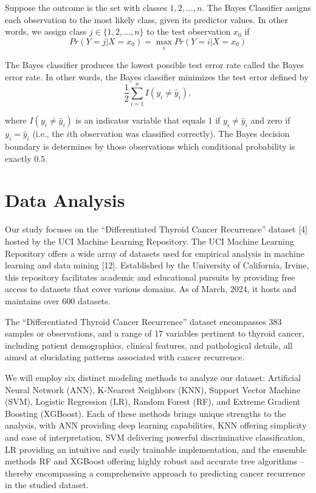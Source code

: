 \documentclass[
  letterpaper,
  DIV=11,
  numbers=noendperiod]{scrartcl}
\begin{document}
Suppose the outcome is the set with classes \(1, 2, \dots, n\). The
Bayes Classifier assigns each observation to the most likely class,
given its predictor values. In other words, we assign class
\(j \in \{1, 2, \dots, n\}\) to the test observation \(x_0\) if
\[Pr(Y = j | X = x_0) = \max_{i} Pr(Y = i | X = x_0)\]

The Bayes classifier produces the lowest possible test error rate called
the Bayes error rate. In other words, the Bayes classifier minimizes the
test error defined by
\[\frac{1}{2} \sum_{i = 1}^{n} I(y_i \neq \hat{y}_i),\]

where \(I(y_i \neq \hat{y}_i)\) is an indicator variable that equals
\(1\) if \(y_i \neq \hat{y}_i\) and zero if \(y_i = \hat{y}_i\) (i.e.,
the \(i\)th observation was classified correctly). The Bayes decision
boundary is determines by those observations which conditional
probability is exactly \(0.5\).

\section{Data Analysis}\label{data-analysis}

Our study focuses on the ``Differentiated Thyroid Cancer Recurrence''
dataset {[}4{]} hosted by the UCI Machine Learning Repository. The UCI
Machine Learning Repository offers a wide array of datasets used for
empirical analysis in machine learning and data mining {[}12{]}.
Established by the University of California, Irvine, this repository
facilitates academic and educational pursuits by providing free access
to datasets that cover various domains. As of March, 2024, it hosts and
maintains over 600 datasets.

The ``Differentiated Thyroid Cancer Recurrence'' dataset encompasses 383
samples or observations, and a range of 17 variables pertinent to
thyroid cancer, including patient demographics, clinical features, and
pathological details, all aimed at elucidating patterns associated with
cancer recurrence.

We will employ six distinct modeling methods to analyze our dataset:
Artificial Neural Network (ANN), K-Nearest Neighbors (KNN), Support
Vector Machine (SVM), Logistic Regression (LR), Random Forest (RF), and
Extreme Gradient Boosting (XGBoost). Each of these methods brings unique
strengths to the analysis, with ANN providing deep learning
capabilities, KNN offering simplicity and ease of interpretation, SVM
delivering powerful discriminative classification, LR providing an
intuitive and easily trainable implementation, and the ensemble methods
RF and XGBoost offering highly robust and accurate tree algorithms --
thereby encompassing a comprehensive approach to predicting cancer
recurrence in the studied dataset.
\end{document}
